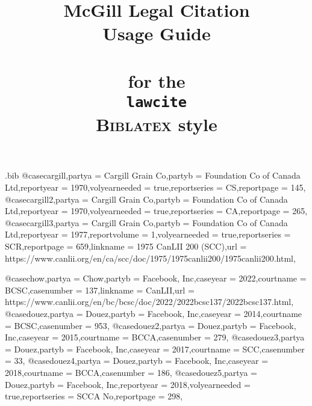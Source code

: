 \begin{filecontents*}[overwrite]{\jobname.bib}
@case{cargill,partya = {Cargill Grain Co},partyb = {Foundation Co of Canada Ltd},reportyear = {1970},volyearneeded = {true},reportseries = {CS},reportpage = {145},}
@case{cargill2,partya = {Cargill Grain Co},partyb = {Foundation Co of Canada Ltd},reportyear = {1970},volyearneeded = {true},reportseries = {CA},reportpage = {265},}
@case{cargill3,partya = {Cargill Grain Co},partyb = {Foundation Co of Canada Ltd},reportyear = {1977},reportvolume = {1},volyearneeded = {true},reportseries = {SCR},reportpage = {659},linkname = {1975 CanLII 200 (SCC)},url = {https://www.canlii.org/en/ca/scc/doc/1975/1975canlii200/1975canlii200.html},}

@case{chow,partya = {Chow},partyb = { Facebook, Inc},caseyear = {2022},courtname = {BCSC},casenumber = {137},linkname = {CanLII},url = {https://www.canlii.org/en/bc/bcsc/doc/2022/2022bcsc137/2022bcsc137.html},}
@case{douez,partya = {Douez},partyb = { Facebook, Inc},caseyear = {2014},courtname = {BCSC},casenumber = {953},}
@case{douez2,partya = {Douez},partyb = { Facebook, Inc},caseyear = {2015},courtname = {BCCA},casenumber = {279},}
@case{douez3,partya = {Douez},partyb = { Facebook, Inc},caseyear = {2017},courtname = {SCC},casenumber = {33},}
@case{douez4,partya = {Douez},partyb = { Facebook, Inc},caseyear = {2018},courtname = {BCCA},casenumber = {186},}
@case{douez5,partya = {Douez},partyb = { Facebook, Inc},reportyear = {2018},volyearneeded = {true},reportseries = {SCCA No},reportpage = {298},}



\end{filecontents*}




\documentclass[12pt]{article}
\newcommand\rulesep{\rule{0.4\textwidth}{.4pt}}

\title{McGill Legal Citation\\Usage Guide\\ \ \\{\normalsize for  the\\  \texttt{lawcite}\\  \textsc{Biblatex} style}}
\author{}
\date{}
\long\gdef{}
\usepackage[table,dvipsnames,svgnames]{xcolor}
\pagecolor{blue!3}
\usepackage{fontspec}
\setmainfont{Noto Serif}
\setsansfont{TeX Gyre Adventor}[Scale=1.2]%
\setmonofont{Noto Sans Mono}%
\newfontface{}[Colour=blue]
\newcommand\circnum[1]{{\fcircnum#1}}
\usepackage[british]{babel}
\usepackage{csquotes}
\usepackage{graphicx}

